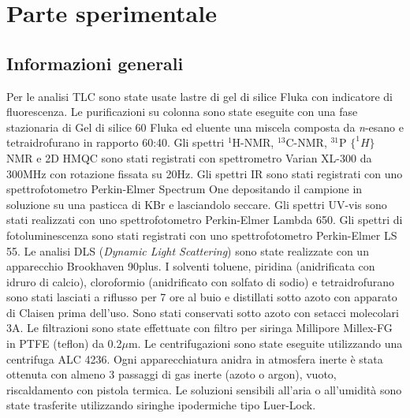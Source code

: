 \chapter{Parte sperimentale}

\section{Informazioni generali}
Per le analisi TLC sono state usate lastre di gel di silice Fluka con indicatore di fluorescenza.
Le purificazioni su colonna sono state eseguite con una fase stazionaria di Gel di silice 60 Fluka ed eluente una miscela composta da {\itshape n}-esano e tetraidrofurano in rapporto 60:40.
Gli spettri $^1$H-NMR, $^{13}$C-NMR, $^{31}$P $\{^1H\}$ NMR e 2D HMQC sono stati registrati con spettrometro Varian XL-300 da 300MHz con rotazione fissata su 20Hz.
Gli spettri IR sono stati registrati con uno spettrofotometro Perkin-Elmer Spectrum One depositando il campione in soluzione su una pasticca di KBr e lasciandolo seccare.
Gli spettri UV-vis sono stati realizzati con uno spettrofotometro Perkin-Elmer Lambda 650.
Gli spettri di fotoluminescenza sono stati registrati con uno spettrofotometro Perkin-Elmer LS 55.
Le analisi DLS (\emph{Dynamic Light Scattering}) sono state realizzate con un apparecchio Brookhaven 90plus.
I solventi toluene, piridina (anidrificata con idruro di calcio), cloroformio (anidrificato con solfato di sodio) e tetraidrofurano sono stati lasciati a riflusso per 7 ore al buio e distillati sotto azoto con apparato di Claisen prima dell’uso. Sono stati conservati sotto azoto con setacci molecolari 3A. 
Le filtrazioni sono state effettuate con filtro per siringa Millipore Millex-FG in PTFE (teflon) da 0.2$\mu$m.
Le centrifugazioni sono state eseguite utilizzando una centrifuga ALC 4236.
Ogni apparecchiatura anidra in atmosfera inerte è stata ottenuta con almeno 3 passaggi di gas inerte (azoto o argon), vuoto, riscaldamento con pistola termica.
Le soluzioni sensibili all’aria o all’umidità sono state trasferite utilizzando siringhe ipodermiche tipo Luer-Lock.

